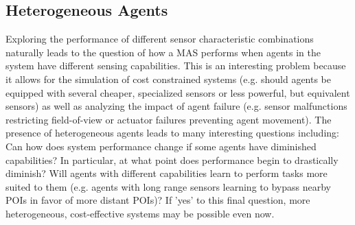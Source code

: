 \documentclass[letterpaper, 10 pt, conference]{ieeeconf}  %
\begin{document}
\subsection{Heterogeneous Agents}
Exploring the performance of different sensor characteristic combinations naturally leads to the question of how a MAS performs when agents in the system have different sensing capabilities. This is an interesting problem because it allows for the simulation of cost constrained systems (e.g. should agents be equipped with several cheaper, specialized sensors or less powerful, but equivalent sensors) as well as analyzing the impact of agent failure (e.g. sensor malfunctions restricting field-of-view or actuator failures preventing agent movement). The presence of heterogeneous agents leads to many interesting questions including: Can how does system performance change if some agents have diminished capabilities? In particular, at what point does performance begin to drastically diminish? Will agents with different capabilities learn to perform tasks more suited to them (e.g. agents with long range sensors learning to bypass nearby POIs in favor of more distant POIs)? If 'yes' to this final question, more heterogeneous, cost-effective systems may be possible even now.



\end{document}
